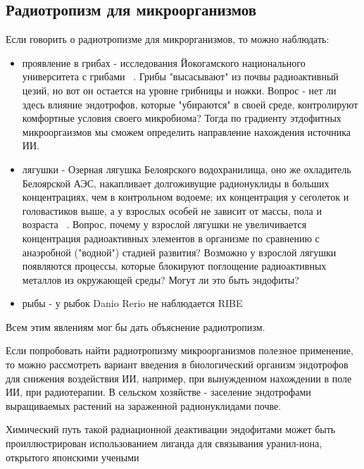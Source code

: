 \documentclass[11pt]{article}
\begin{document}
\subsection{Радиотропизм для микроорганизмов}
Если говорить о радиотропизме для микрорганизмов, то можно наблюдать:
\begin{itemize} 
\item проявление в грибах - исследования Йокогамского национального университета с грибами ~\cite{hizh_12_11_2020}. Грибы "высасывают" из почвы радиоактивный цезий, но вот он остается на уровне грибницы и ножки. Вопрос - нет ли здесь влияние эндотрофов, которые "убираются" в своей среде, контролируют комфортные условия своего микробиома? Тогда по градиенту этдофитных микрооргаизмов мы сможем определить направление нахождения источника ИИ.

\item лягушки - Озерная лягушка Белоярского водохранилища, оно же охладитель Белоярской АЭС, накапливает долгоживущие радионуклиды в больших концентрациях, чем в контрольном водоеме; их концентрация у сеголеток и головастиков выше, а у взрослых особей не зависит от массы, пола и возраста ~\cite{bvv}. Вопрос, почему у взрослой лягушки не увеличивается концентрация радиоактивных элементов в организме по сравнению с анаэробной ("водной") стадией развития? Возможно у взрослой лягушки появляются процессы, которые блокируют поглощение радиоактивных металлов из окружающей среды? Могут ли это быть эндофиты?

\item рыбы - у рыбок Danio Rerio не наблюдается RIBE ~\cite{zebrafish_1,zebrafish_2,zebrafish_3,zebrafish_4,zebrafish_5}

\end{itemize} 

Всем этим явлениям мог бы дать объяснение радиотропизм.

Если попробовать найти радиотропизму микроорганизмов полезное применение, то можно рассмотреть вариант введения в биологический организм эндотрофов для снижения воздействия ИИ, например, при вынужденном нахождении в поле ИИ, при радиотерапии. В сельском хозяйстве - заселение эндотрофами выращиваемых растений на зараженной радионуклидами почве.

Химический путь такой радиационной деактивации эндофитами может быть проиллюстрирован использованием лиганда для связывания уранил-иона, открытого японскими учеными ~\cite{Keiko}
\end{document}
